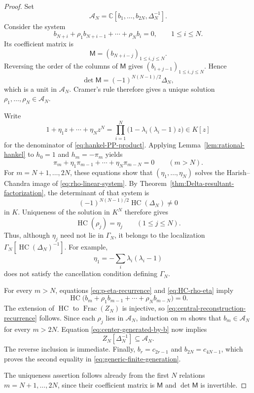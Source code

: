 \documentclass[11pt]{amsart}
\numberwithin{equation}{section}
\theoremstyle{definition}
\theoremstyle{remark}
\newcommand{\C}{\mathbb C}
\newcommand{\HC}{\operatorname{HC}}
\begin{document}
\begin{proof}
Set
\[
 \mathcal A_N
 =\C[b_1,\ldots,b_{2N},\Delta_N^{-1}].
\]
Consider the system
\begin{equation}
 b_{N+i}+\rho_1b_{N+i-1}+\cdots+\rho_Nb_i=0,
 \qquad 1\leq i\leq N.
 \label{eq:rho-linear-system}
\end{equation}
Its coefficient matrix is
\[
 \mathsf M=(b_{N+i-j})_{1\leq i,j\leq N}.
\]
Reversing the order of the columns of \(\mathsf M\) gives
\((b_{i+j-1})_{1\leq i,j\leq N}\).  Hence
\begin{equation}
 \det\mathsf M
 =(-1)^{N(N-1)/2}\Delta_N,
 \label{eq:M-determinant}
\end{equation}
which is a unit in \(\mathcal A_N\).  Cramer's rule therefore gives a
unique solution
\(\rho_1,\ldots,\rho_N\in\mathcal A_N\).

Write
\begin{equation}
 1+\eta_1z+\cdots+\eta_Nz^N
 =\prod_{i=1}^N
  \bigl(1-\lambda_i(\lambda_i-1)z\bigr)
 \in K[z]
 \label{eq:eta-denominator}
\end{equation}
for the denominator of \eqref{eq:hankel-PP-product}.  Applying
Lemma~\ref{lem:rational-hankel} to
\(h_0=1\) and \(h_m=-\pi_m\) yields
\begin{equation}
 \pi_m+\eta_1\pi_{m-1}+\cdots+\eta_N\pi_{m-N}=0
 \qquad(m>N).
 \label{eq:p-eta-recurrence}
\end{equation}
For \(m=N+1,\ldots,2N\), these equations show that
\((\eta_1,\ldots,\eta_N)\) solves the Harish--Chandra image of
\eqref{eq:rho-linear-system}.  By
Theorem~\ref{thm:Delta-resultant-factorization}, the determinant of that system is
\[
 (-1)^{N(N-1)/2}\HC(\Delta_N)\neq0
\]
in \(K\).  Uniqueness of the solution in \(K^N\) therefore gives
\begin{equation}
 \HC(\rho_j)=\eta_j
 \qquad(1\leq j\leq N).
 \label{eq:HC-rho-eta}
\end{equation}
Thus, although \(\eta_j\) need not lie in \(\Gamma_N\), it belongs to
the localization
\(\Gamma_N[\HC(\Delta_N)^{-1}]\).  For example,
\[
 \eta_1=-\sum_i\lambda_i(\lambda_i-1)
\]
does not satisfy the cancellation condition defining \(\Gamma_N\).

For every \(m>N\), equations \eqref{eq:p-eta-recurrence} and
\eqref{eq:HC-rho-eta} imply
\[
 \HC\bigl(
  b_m+\rho_1b_{m-1}+\cdots+\rho_Nb_{m-N}
 \bigr)=0.
\]
The extension of \(\HC\) to \(\operatorname{Frac}(Z_N)\) is injective,
so \eqref{eq:central-reconstruction-recurrence} follows.  Since each
\(\rho_j\) lies in \(\mathcal A_N\), induction on \(m\) shows that
\(b_m\in\mathcal A_N\) for every \(m>2N\).  Equation
\eqref{eq:center-generated-by-b} now implies
\[
 Z_N[\Delta_N^{-1}]\subseteq\mathcal A_N.
\]
The reverse inclusion is immediate.  Finally,
\(b_r=c_{2r-1}\) and \(b_{2N}=c_{4N-1}\), which proves the second
equality in \eqref{eq:generic-finite-generation}.

The uniqueness assertion follows already from the first \(N\)
relations \(m=N+1,\ldots,2N\), since their coefficient matrix is
\(\mathsf M\) and \(\det\mathsf M\) is invertible.
\end{proof}
\end{document}
